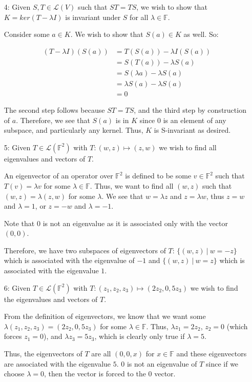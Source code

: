 \documentclass[12pt]{article}
\newcommand{\F}{\mathbb{F}}
\renewcommand{\L}{\mathcal{L}}
\begin{document}
\begin{enumerate}
\item[4:]
  Given $S, T \in \L(V)$ such that $ST = TS$, we wish to show that $K = ker(T - \lambda I)$ is invariant under $S$ for all $\lambda \in \F$.

  Consider some $a \in K$. We wish to show that $S(a) \in K$ as well. So:

  \begin{align*}
    (T - \lambda I)(S(a)) &= T(S(a)) - \lambda I(S(a)) \\
    &= S(T(a)) - \lambda S(a) \\
    &= S(\lambda a) - \lambda S(a) \\
    &= \lambda S(a) - \lambda S(a) \\
    &= 0
  \end{align*}

  The second step follows because $ST = TS$, and the third step by construction of $a$. Therefore, we see that $S(a)$ is in $K$ since $0$ is an element of any subspace, and particularly any kernel. Thus, $K$ is S-invariant as desired.

\item[5:]
  Given $T \in \L(\F^2)$ with $T: (w, z) \mapsto (z, w)$ we wish to find all eigenvalues and vectors of $T$.

  An eigenvector of an operator over $\F^2$ is defined to be some $v \in \F^2$ such that $T(v) = \lambda v$ for some $\lambda \in \F$. Thus, we want to find all $(w, z)$ such that $(w, z) = \lambda (z, w)$ for some $\lambda$. We see that $w = \lambda z$ and $z = \lambda w$, thus $z = w$ and $\lambda = 1$, or $z = -w$ and $\lambda = -1$.

  Note that $0$ is not an eigenvalue as it is associated only with the vector $(0, 0)$.

  Therefore, we have two subspaces of eigenvectors of $T$: $\{(w, z)\ |\ w = -z\}$ which is associated with the eigenvalue of $-1$ and $\{(w, z)\ |\ w = z\}$ which is associated with the eigenvalue $1$.

\item[6:]
  Given $T \in \L(\F^2)$ with $T: (z_1, z_2, z_3) \mapsto (2z_2, 0, 5z_3)$ we wish to find the eigenvalues and vectors of $T$.

  From the definition of eigenvectors, we know that we want some $\lambda (z_1, z_2, z_3) = (2z_2, 0, 5z_3)$ for some $\lambda \in \F$. Thus, $\lambda z_1 = 2z_2$, $z_2 = 0$ (which forces $z_1 = 0$), and $\lambda z_3 = 5 z_3$, which is clearly only true if $\lambda = 5$.
  
  Thus, the eigenvectors of $T$ are all $(0, 0, x)$ for $x \in \F$ and these eigenvectors are associated with the eigenvalue $5$. $0$ is not an eigenvalue of $T$ since if we choose $\lambda = 0$, then the vector is forced to the $0$ vector.



\end{enumerate}
\end{document}
